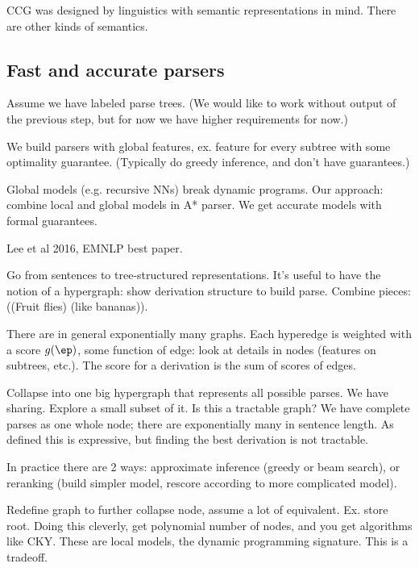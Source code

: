 
CCG was designed by linguistics with semantic representations in mind. There are other kinds of semantics. 


\subsection{Fast and accurate parsers}
Assume we have labeled parse trees. (We would like to work without output of the previous step, but for now we have higher requirements for now.)

We build parsers with global features, ex. feature for every subtree with some optimality guarantee. (Typically do greedy inference, and don't have guarantees.)

Global models (e.g. recursive NNs) break dynamic programs. Our approach: combine local and global models in A* parser. We get accurate models with formal guarantees.

Lee et al 2016, EMNLP best paper.

Go from sentences to tree-structured representations. It's useful to have the notion of a hypergraph: show derivation structure to build parse. Combine pieces: ((Fruit flies) (like bananas)).

There are in general exponentially many graphs. Each hyperedge is weighted with a score $g(\ep)$, some function of edge: look at details in nodes (features on subtrees, etc.). The score for a derivation is the sum of scores of edges.

Collapse into one big hypergraph that represents all possible parses. We have sharing. Explore a small subset of it.
Is this a tractable graph? We have complete parses as one whole node; there are exponentially many in sentence length. As defined this is expressive,  but finding the best derivation is not tractable.

In practice there are 2 ways: approximate inference (greedy or beam search), or reranking (build simpler model, rescore according to more complicated model). 

Redefine graph to further collapse node, assume a lot of equivalent. Ex. store root. Doing this cleverly, get polynomial number of nodes, and you get algorithms like CKY. These are local models, the dynamic programming signature. This is a tradeoff.

